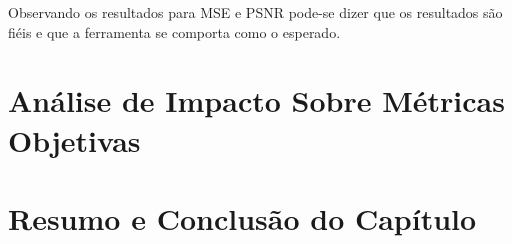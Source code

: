 Observando os resultados para MSE e PSNR pode-se dizer que os resultados são fiéis e que a ferramenta se comporta como o esperado.

\section{Análise de Impacto Sobre Métricas Objetivas}

\section{Resumo e Conclusão do Capítulo}

